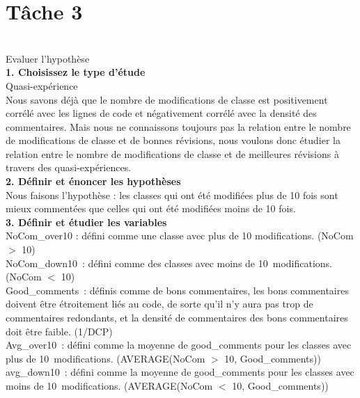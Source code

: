 \documentclass{article}
\begin{document}
\section*{Tâche 3}\\
Evaluer l’hypothèse\\

\textbf{1. Choisissez le type d'étude}\\

Quasi-expérience\\

Nous savons déjà que le nombre de modifications de classe est positivement corrélé avec les lignes de code et négativement corrélé avec la densité des commentaires. Mais nous ne connaissons toujours pas la relation entre le nombre de modifications de classe et de bonnes révisions, nous voulons donc étudier la relation entre le nombre de modifications de classe et de meilleures révisions à travers des quasi-expériences.\\

\textbf{2. Définir et énoncer les hypothèses}\\

Nous faisons l'hypothèse : les classes qui ont été modifiées plus de 10 fois sont mieux commentées que celles qui ont été modifiées moins de 10 fois.\\

\textbf{3. Définir et étudier les variables}\\

NoCom\_over10 : défini comme une classe avec plus de 10 modifications. (NoCom $>$ 10)\\

NoCom\_down10 : défini comme des classes avec moins de 10 modifications. (NoCom $<$ 10)\\

Good\_comments : définis comme de bons commentaires, les bons commentaires doivent être étroitement liés au code, de sorte qu'il n'y aura pas trop de commentaires redondants, et la densité de commentaires des bons commentaires doit être faible. (1/DCP)\\

Avg\_over10 : défini comme la moyenne de good\_comments pour les classes avec plus de 10 modifications. (AVERAGE(NoCom $>$ 10, Good\_comments))\\

avg\_down10 : défini comme la moyenne de good\_comments pour les classes avec moins de 10 modifications. (AVERAGE(NoCom $<$ 10, Good\_comments))\\
\end{document}

